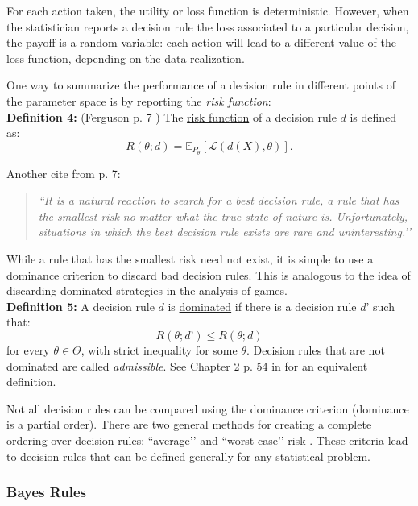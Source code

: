 \documentclass[11pt]{article} %
\begin{document}
For each action taken, the utility or loss function is deterministic. However, when the statistician reports a decision rule the loss associated to a particular decision, the payoff is a random variable: each action will lead to a different value of the loss function, depending on the data realization. 

One way to summarize the performance of a decision rule in different points of the parameter space is by reporting the \emph{risk function}: \\

\noindent \textbf{Definition 4:} (Ferguson p. 7 ) The \underline{risk function} of a decision rule $d$ is defined as:
\[ R(\theta; d) = \mathbb{E}_{P_{\theta}}[\mathcal{L}(d(X),\theta)]. \]

\noindent Another cite from \cite{Ferguson67} p. 7:

\begin{quote}
\emph{``It is a natural reaction to search for a best decision rule, a rule that has the smallest risk no matter what the true state of nature is. Unfortunately, situations in which the best decision rule exists are rare and uninteresting.’’}
\end{quote}

\noindent While a rule that has the smallest risk need not exist, it is simple to use a dominance criterion to discard bad decision rules. This is analogous to the idea of discarding dominated strategies in the analysis of games. \\ 

\noindent \textbf{Definition 5:} A decision rule $d$ is \underline{dominated} if there is a decision rule $d’$ such that:
\[R(\theta;d’) \leq R(\theta;d)\]
for every $\theta \in \Theta$, with strict inequality for some $\theta$. Decision rules that are not dominated are called \emph{admissible}.  See Chapter 2 p. 54 in \cite{Ferguson67} for an equivalent definition. 

Not all decision rules can be compared using the dominance criterion (dominance is a partial order). There are two general methods for creating a complete ordering over decision rules: ``average’’ and ``worst-case’’ risk . These criteria lead to decision rules that can be defined generally for any statistical problem. 


\subsubsection{Bayes Rules} 
\end{document}
